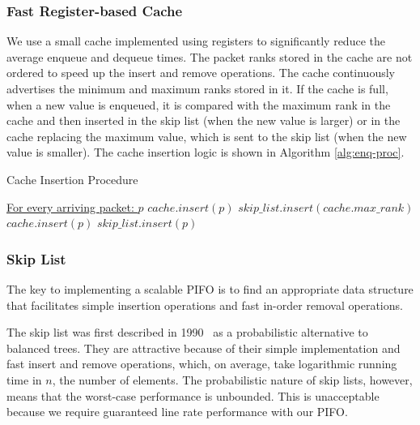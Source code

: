 \subsubsection{Fast Register-based Cache}\label{sec:reg-cache}

We use a small cache implemented using registers to significantly reduce the average enqueue and dequeue times.  The packet ranks stored in the cache are not ordered to speed up the insert and remove operations.  The cache continuously advertises the minimum and maximum ranks stored in it. If the cache is full, when a new value is enqueued, it is compared with the maximum rank in the cache and then inserted in the skip list (when the new value is larger) or in the cache replacing the maximum value, which is sent to the skip list (when the new value is smaller). The cache insertion logic is shown in Algorithm \ref{alg:enq-proc}.

\begin{algorithm}
\footnotesize
\caption{Cache Insertion Procedure}\label{alg:enq-proc}
\begin{algorithmic}[1]
  \State \underline{For every arriving packet: $p$}
   \State $cache.insert(p)$
  \Else 
     \State $skip\_list.insert(cache.max\_rank)$
     \State $cache.insert(p)$
    \Else
     \State $skip\_list.insert(p)$
    \EndIf
  \EndIf
\end{algorithmic}
\end{algorithm}

\subsubsection{Skip List}\label{sec:skip-list-impl}

The key to implementing a scalable PIFO is to find an appropriate data structure that facilitates simple insertion operations and fast in-order removal operations.

The skip list was first described in 1990~\cite{skip-list-1990} as a probabilistic alternative to balanced trees. They are attractive because of their simple implementation and fast insert and remove operations, which, on average, take logarithmic running time in $n$, the number of elements. The probabilistic nature of skip lists, however, means that the worst-case performance is unbounded. This is unacceptable because we require guaranteed line rate performance with our PIFO. 

